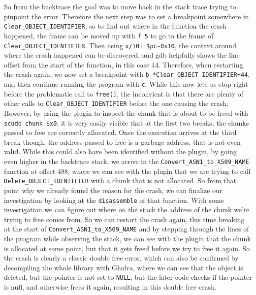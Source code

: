 \documentclass[a4paper,11pt,oneside]{report}
\begin{document}
So from the backtrace the goal was to move back in the stack trace trying to
pinpoint the error. Therefore the next step was to set a breakpoint somewhere
in \verb|Clear_OBJECT_IDENTIFIER|, so to find out where in the function the
crash happened, the frame can be moved up with \verb|f 5| to go to the frame
of \verb|Clear_OBJECT_IDENTIFIER|. Then using \verb|x/10i $pc-0x10|, the
context around where the crash happened can be discovered, and gdb helpfully
shows the line offset from the start of the function, in this case 44.
Therefore, when restarting the crash again, we now set a breakpoint with
\verb|b *Clear_OBJECT_IDENTIFIER+44|, and then continue running the program
with \verb|c|. While this now lets us stop right before the problematic call
to \verb|free()|, the inconvient is that there are plenty of other calls to
\verb|Clear_OBJECT_IDENTIFIER| before the one causing the crash. However, by
using the plugin to inspect the chunk that is about to be freed with
\verb|scudo chunk $x0|, it is very easily visible that at the first two breaks,
the chunks passed to free are correctly allocated. Once the execution arrives
at the third break though, the address passed to free is a garbage address,
that is not even valid.
While this could also have been identified without the plugin, by going even
higher in the backtrace stack, we arrive in the \verb|Convert_ASN1_to_X509_NAME|
function at offset 488, where we can see with the plugin that we are trying
to call \verb|Delete_OBJECT_IDENTIFIER| with a chunk that is not allocated.
So from that point why we already found the reason for the crash, we can
finalize our investigation by looking at the \verb|disassemble| of that
function. With some investigation we can figure out where on the stack the
address of the chunk we're trying to free comes from. So we can restart the
crash again, this time breaking at the start of \verb|Convert_ASN1_to_X509_NAME|
and by stepping through the lines of the program while observing the stack,
we can see with the plugin that the chunk is allocated at some point, but
that it gets freed before we try to free it again. So the crash is clearly
a classic double free error, which can also be confirmed by decompiling the
whole library with Ghidra, where we can see that the object is deleted, but
the pointer is not set to \verb|NULL|, but the later code checks if the
pointer is null, and otherwise frees it again, resulting in this double free
crash.
\end{document}
